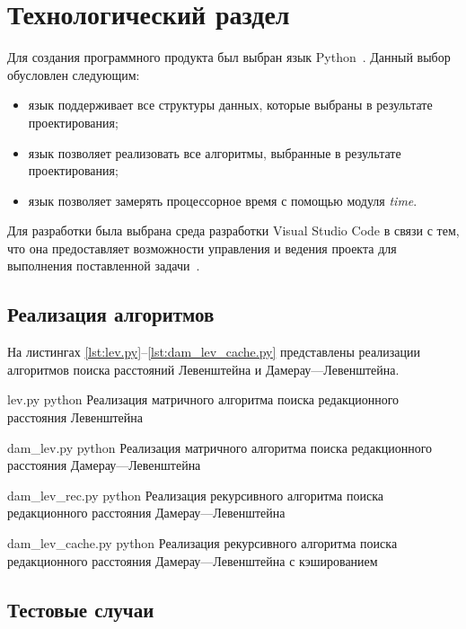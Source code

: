 \chapter{Технологический раздел}

Для создания программного продукта был выбран язык Python~\cite{python}.
Данный выбор обусловлен следующим:
\begin{itemize}
	\item язык поддерживает все структуры данных, которые выбраны в результате проектирования;
	\item язык позволяет реализовать все алгоритмы, выбранные в результате проектирования;
	\item язык позволяет замерять процессорное время с помощью модуля \textit{time}. 
\end{itemize}

Для разработки была выбрана среда разработки Visual Studio Code в связи с тем, что она предоставляет возможности управления и ведения проекта для выполнения поставленной задачи~\cite{vscode}.

\section{Реализация алгоритмов}

На листингах \ref{lst:lev.py}--\ref{lst:dam_lev_cache.py} представлены реализации алгоритмов поиска расстояний Левенштейна и Дамерау---Левенштейна.

\newpage

	{lev.py}
	{python}
	{Реализация матричного алгоритма поиска редакционного расстояния Левенштейна}

\newpage

	{dam_lev.py}
	{python}
	{Реализация матричного алгоритма поиска редакционного расстояния Дамерау---Левенштейна}

\newpage

	{dam_lev_rec.py}
	{python}
	{Реализация рекурсивного алгоритма поиска редакционного расстояния Дамерау---Левенштейна}

\newpage

	{dam_lev_cache.py}
	{python}
	{Реализация рекурсивного алгоритма поиска редакционного расстояния Дамерау---Левенштейна с кэшированием}

\section{Тестовые случаи}

